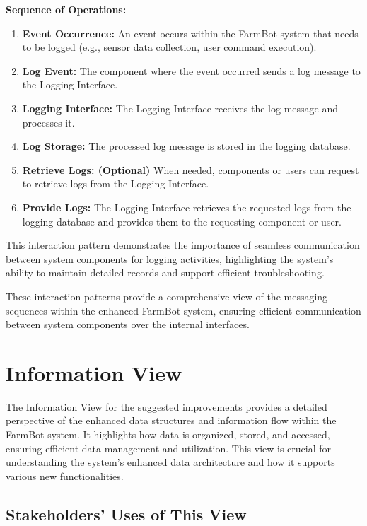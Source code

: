 \textbf{Sequence of Operations:}
\begin{enumerate}
    \item \textbf{Event Occurrence:} An event occurs within the FarmBot system that needs to be logged (e.g., sensor data collection, user command execution).
    \item \textbf{Log Event:} The component where the event occurred sends a log message to the Logging Interface.
    \item \textbf{Logging Interface:} The Logging Interface receives the log message and processes it.
    \item \textbf{Log Storage:} The processed log message is stored in the logging database.
    \item \textbf{Retrieve Logs: (Optional)} When needed, components or users can request to retrieve logs from the Logging Interface.
    \item \textbf{Provide Logs:} The Logging Interface retrieves the requested logs from the logging database and provides them to the requesting component or user.
\end{enumerate}

This interaction pattern demonstrates the importance of seamless communication between system components for logging activities, highlighting the system's ability to maintain detailed records and support efficient troubleshooting.

These interaction patterns provide a comprehensive view of the messaging sequences within the enhanced FarmBot system, ensuring efficient communication between system components over the internal interfaces.



\section{Information View}

The Information View for the suggested improvements provides a detailed perspective of the enhanced data structures and information flow within the FarmBot system. It highlights how data is organized, stored, and accessed, ensuring efficient data management and utilization. This view is crucial for understanding the system's enhanced data architecture and how it supports various new functionalities.


\subsection{Stakeholders’ Uses of This View}

